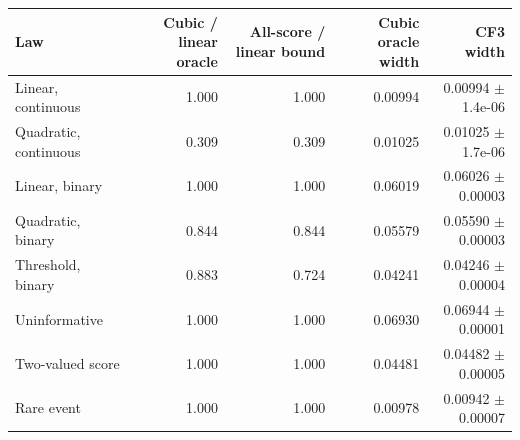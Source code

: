 \small
\begin{tabular}{lrrrr}
\toprule
Law & Cubic / linear oracle & All-score / linear bound & Cubic oracle width & CF3 width \\
\midrule
Linear, continuous & 1.000 & 1.000 & 0.00994 & 0.00994 $\pm$ 1.4e-06 \\
Quadratic, continuous & 0.309 & 0.309 & 0.01025 & 0.01025 $\pm$ 1.7e-06 \\
Linear, binary & 1.000 & 1.000 & 0.06019 & 0.06026 $\pm$ 0.00003 \\
Quadratic, binary & 0.844 & 0.844 & 0.05579 & 0.05590 $\pm$ 0.00003 \\
Threshold, binary & 0.883 & 0.724 & 0.04241 & 0.04246 $\pm$ 0.00004 \\
Uninformative & 1.000 & 1.000 & 0.06930 & 0.06944 $\pm$ 0.00001 \\
Two-valued score & 1.000 & 1.000 & 0.04481 & 0.04482 $\pm$ 0.00005 \\
Rare event & 1.000 & 1.000 & 0.00978 & 0.00942 $\pm$ 0.00007 \\
\bottomrule
\end{tabular}
